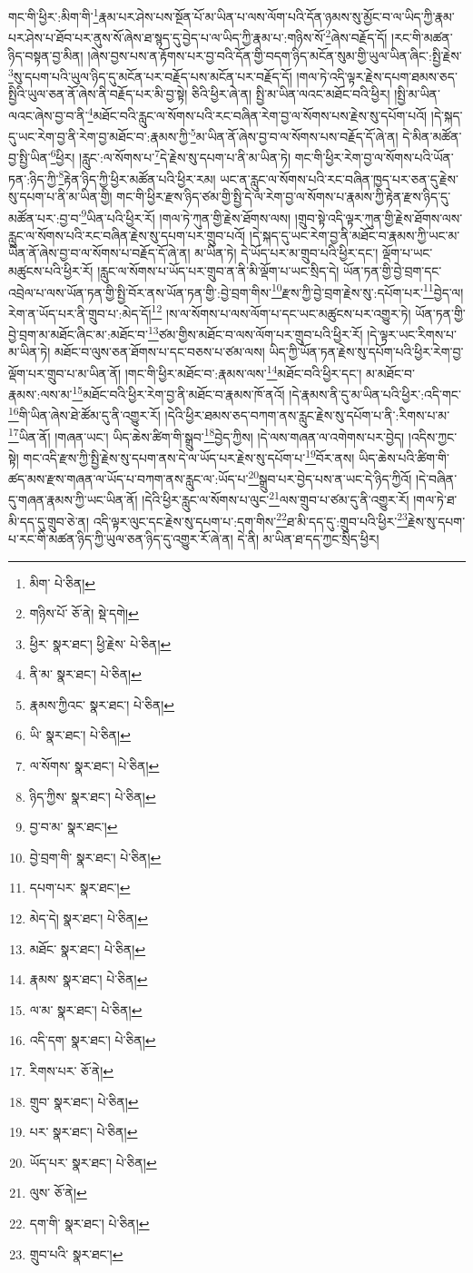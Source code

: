 གང་གི་ཕྱིར་:མིག་གི་\footnote{མིག་  པེ་ཅིན། }རྣམ་པར་ཤེས་པས་སྔོན་པོ་མ་ཡིན་པ་ལས་ལོག་པའི་དོན་ཉམས་སུ་མྱོང་བ་ལ་ཡིད་ཀྱི་རྣམ་པར་ཤེས་པ་ཐོབ་པར་ནུས་སོ་ཞེས་ཐ་སྙད་དུ་བྱེད་པ་ལ་ཡིད་ཀྱི་རྣམ་པ་:གཉིས་སོ་\footnote{གཉིས་པོ་  ཅོ་ནེ།  སྡེ་དགེ། }ཞེས་བརྗོད་དོ། །རང་གི་མཚན་ཉིད་བསྟན་བྱ་མིན། །ཞེས་བྱས་པས་ན་རྟོགས་པར་བྱ་བའི་དོན་གྱི་བདག་ཉིད་མངོན་སུམ་གྱི་ཡུལ་ཡིན་ཞིང་:སྤྱི་རྗེས་\footnote{ཕྱིར་  སྣར་ཐང་། ཕྱི་རྗེས་  པེ་ཅིན། }སུ་དཔག་པའི་ཡུལ་ཉིད་དུ་མངོན་པར་བརྗོད་པས་མངོན་པར་བརྗོད་དོ། །གལ་ཏེ་འདི་ལྟར་རྗེས་དཔག་ཐམས་ཅད་སྤྱིའི་ཡུལ་ཅན་ནོ་ཞེས་ནི་བརྗོད་པར་མི་བྱ་སྟེ། ཅིའི་ཕྱིར་ཞེ་ན། སྤྱི་མ་ཡིན་ལའང་མཐོང་བའི་ཕྱིར། །སྤྱི་མ་ཡིན་ལའང་ཞེས་བྱ་བ་ནི་\footnote{ནི་མ་  སྣར་ཐང་།  པེ་ཅིན། }མཐོང་བའི་རླུང་ལ་སོགས་པའི་རང་བཞིན་རེག་བྱ་ལ་སོགས་པས་རྗེས་སུ་དཔོག་པའོ། །དེ་སྐད་དུ་ཡང་རེག་བྱ་ནི་རེག་བྱ་མཐོང་བ་:རྣམས་ཀྱི་\footnote{རྣམས་ཀྱིའང་  སྣར་ཐང་།  པེ་ཅིན། }མ་ཡིན་ནོ་ཞེས་བྱ་བ་ལ་སོགས་པས་བརྗོད་དོ་ཞེ་ན། དེ་མིན་མཚོན་བྱ་སྤྱི་ཡིན་\footnote{ཡི་  སྣར་ཐང་།  པེ་ཅིན། }ཕྱིར། །རླུང་:ལ་སོགས་པ་\footnote{ལ་སོགས་  སྣར་ཐང་།  པེ་ཅིན། }དེ་རྗེས་སུ་དཔག་པ་ནི་མ་ཡིན་ཏེ། གང་གི་ཕྱིར་རེག་བྱ་ལ་སོགས་པའི་ཡོན་ཏན་:ཉིད་ཀྱི་\footnote{ཉིད་ཀྱིས་  སྣར་ཐང་།  པེ་ཅིན། }རྟེན་ཉིད་ཀྱི་ཕྱིར་མཚོན་པའི་ཕྱིར་རམ། ཡང་ན་རླུང་ལ་སོགས་པའི་རང་བཞིན་ཁྱད་པར་ཅན་དུ་རྗེས་སུ་དཔག་པ་ནི་མ་ཡིན་གྱི། གང་གི་ཕྱིར་རྫས་ཉིད་ཙམ་གྱི་སྤྱི་དེ་ལ་རེག་བྱ་ལ་སོགས་པ་རྣམས་ཀྱི་རྟེན་རྫས་ཉིད་དུ་མཚོན་པར་:བྱ་བ་\footnote{བྱ་བ་མ་  སྣར་ཐང་། }ཡིན་པའི་ཕྱིར་རོ། །གལ་ཏེ་ཀུན་གྱི་རྗེས་ཐོགས་ལས། །གྲུབ་སྟེ་འདི་ལྟར་ཀུན་གྱི་རྗེས་ཐོགས་ལས་རླུང་ལ་སོགས་པའི་རང་བཞིན་རྗེས་སུ་དཔག་པར་གྲུབ་པའོ། །དེ་སྐད་དུ་ཡང་རེག་བྱ་ནི་མཐོང་བ་རྣམས་ཀྱི་ཡང་མ་ཡིན་ནོ་ཞེས་བྱ་བ་ལ་སོགས་པ་བརྗོད་དོ་ཞེ་ན། མ་ཡིན་ཏེ། དེ་ཡོད་པར་མ་གྲུབ་པའི་ཕྱིར་དང་། ལྡོག་པ་ཡང་མཚུངས་པའི་ཕྱིར་རོ། །རླུང་ལ་སོགས་པ་ཡོད་པར་གྲུབ་ན་ནི་མི་ལྡོག་པ་ཡང་སྲིད་དེ། ཡོན་ཏན་གྱི་བྱེ་བྲག་དང་འབྲེལ་པ་ལས་ཡོན་ཏན་གྱི་སྤྱི་བོར་ནས་ཡོན་ཏན་གྱི་:བྱེ་བྲག་གིས་\footnote{བྱེ་བྲག་གི་  སྣར་ཐང་།  པེ་ཅིན། }རྫས་ཀྱི་བྱེ་བྲག་རྗེས་སུ་:དཔོག་པར་\footnote{དཔག་པར་  སྣར་ཐང་། }བྱེད་ལ། རེག་ན་ཡོད་པར་ནི་གྲུབ་པ་:མེད་དོ།\footnote{མེད་དེ།  སྣར་ཐང་།  པེ་ཅིན། } །ས་ལ་སོགས་པ་ལས་ལོག་པ་དང་ཡང་མཚུངས་པར་འགྱུར་ཏེ། ཡོན་ཏན་གྱི་བྱེ་བྲག་མ་མཐོང་ཞིང་མ་:མཐོང་བ་\footnote{མཐོང་  སྣར་ཐང་།  པེ་ཅིན། }ཙམ་གྱིས་མཐོང་བ་ལས་ལོག་པར་གྲུབ་པའི་ཕྱིར་རོ། །དེ་ལྟར་ཡང་རིགས་པ་མ་ཡིན་ཏེ། མཐོང་བ་ལུས་ཅན་ཐོགས་པ་དང་བཅས་པ་ཙམ་ལས། ཡིད་ཀྱི་ཡོན་ཏན་རྗེས་སུ་དཔོག་པའི་ཕྱིར་རེག་བྱ་ལྡོག་པར་གྲུབ་པ་མ་ཡིན་ནོ། །གང་གི་ཕྱིར་མཐོང་བ་:རྣམས་ལས་\footnote{རྣམས་  སྣར་ཐང་།  པེ་ཅིན། }མཐོང་བའི་ཕྱིར་དང་། མ་མཐོང་བ་རྣམས་:ལས་མ་\footnote{ལ་མ་  སྣར་ཐང་།  པེ་ཅིན། }མཐོང་བའི་ཕྱིར་རེག་བྱ་ནི་མཐོང་བ་རྣམས་ཁོ་ནའོ། །དེ་རྣམས་ནི་དུ་མ་ཡིན་པའི་ཕྱིར་:འདི་གང་\footnote{འདི་དག་  སྣར་ཐང་།  པེ་ཅིན། }གི་ཡིན་ཞེས་ཐེ་ཚོམ་དུ་ནི་འགྱུར་རོ། །དེའི་ཕྱིར་ཐམས་ཅད་བཀག་ནས་རླུང་རྗེས་སུ་དཔོག་པ་ནི་:རིགས་པ་མ་\footnote{རིགས་པར་  ཅོ་ནེ། }ཡིན་ནོ། །གཞན་ཡང་། ཡིད་ཆེས་ཚིག་གི་སྒྲུབ་\footnote{གྲུབ་  སྣར་ཐང་།  པེ་ཅིན། }བྱེད་ཀྱིས། །དེ་ལས་གཞན་ལ་འགེགས་པར་བྱེད། །འདིས་ཀྱང་སྟེ། གང་འདི་རྫས་ཀྱི་སྤྱི་རྗེས་སུ་དཔག་ནས་དེ་ལ་ཡོད་པར་རྗེས་སུ་དཔོག་པ་\footnote{པར་  སྣར་ཐང་།  པེ་ཅིན། }བོར་ནས། ཡིད་ཆེས་པའི་ཚིག་གི་ཚད་མས་རྫས་གཞན་ལ་ཡོད་པ་བཀག་ནས་རླུང་ལ་:ཡོད་པ་\footnote{ཡོད་པར་  སྣར་ཐང་།  པེ་ཅིན། }སྒྲུབ་པར་བྱེད་པས་ན་ཡང་དེ་ཉིད་ཀྱིའོ། །དེ་བཞིན་དུ་གཞན་རྣམས་ཀྱི་ཡང་ཡིན་ནོ། །དེའི་ཕྱིར་རླུང་ལ་སོགས་པ་ལུང་\footnote{ལུས་  ཅོ་ནེ། }ལས་གྲུབ་པ་ཙམ་དུ་ནི་འགྱུར་རོ། །གལ་ཏེ་ཐ་མི་དད་དུ་གྲུབ་ཅེ་ན། འདི་ལྟར་ལུང་དང་རྗེས་སུ་དཔག་པ་:དག་གིས་\footnote{དག་གི་  སྣར་ཐང་།  པེ་ཅིན། }ཐ་མི་དད་དུ་:གྲུབ་པའི་ཕྱིར་\footnote{གྲུབ་པའི་  སྣར་ཐང་། }རྗེས་སུ་དཔག་པ་རང་གི་མཚན་ཉིད་ཀྱི་ཡུལ་ཅན་ཉིད་དུ་འགྱུར་རོ་ཞེ་ན། དེ་ནི། མ་ཡིན་ཐ་དད་ཀྱང་སྲིད་ཕྱིར། 